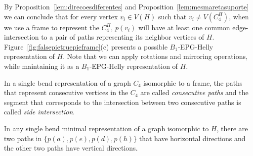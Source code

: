 \documentclass[runningheads]{llncs}
\begin{document}

By Proposition~\ref{lem:direcoesdiferentes} and Proposition~\ref{lem:mesmaretasuporte} we can conclude that for every vertex $v_i \in V(H)$ such that $v_i \neq V(C_4^{H})$, when we use a frame to represent the $C_4^{H}$, $p(v_i)$ will have at least one common edge-intersection to a pair of paths representing its neighbor vertices of $H$. 
Figure~\ref{fig:falsepietruepieframe}(c) presents a possible $B_{1}$-EPG-Helly representation of $H$. 
Note that we can apply rotations and mirroring operations, while maintaining it as a $B_1$-EPG-Helly representation of $H$.

\begin{definition}
In a single bend representation of a graph $C_4$ isomorphic to a frame, the paths that represent consecutive vertices in the $C_4$ are called \emph{consecutive paths} and the segment that corresponds to the intersection between two consecutive paths is called \emph{side intersection}.  
\end{definition}

\begin{lemma}\label{lem:2vertical2horizontal}
In any single bend minimal representation of a graph isomorphic to $H$, there are two paths in $\{p(a), p(e), p(d), p(h) \}$ that have horizontal directions and the other two paths have vertical directions.
\end{lemma}



\end{document}
